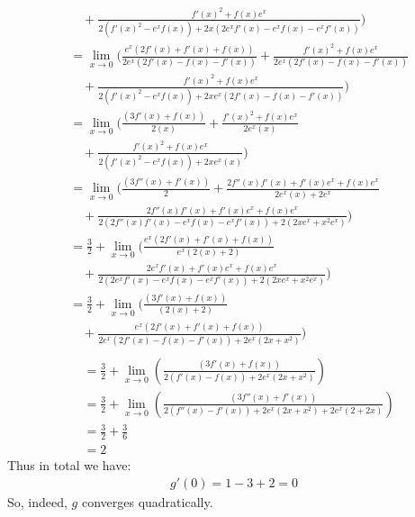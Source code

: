 \documentclass{article}
\begin{document}
\begin{enumerate}[label=\alph*.)]
\begin{align*}
&\quad +\frac{f'(x)^2 + f(x)e^x}{2(f'(x)^2 -e^xf(x)) + 2x(2e^xf'(x) - e^xf(x) - e^xf'(x))} )\\
&= \lim_{x \rightarrow 0}(\frac{e^{x}(2f'(x) + f'(x) + f(x))}{2e^x(2f'(x) - f(x) - f'(x))} + \frac{f'(x)^2 + f(x)e^x}{2e^x(2f'(x) - f(x) - f'(x))} \\
&\quad +\frac{f'(x)^2 + f(x)e^x}{2(f'(x)^2 -e^xf(x)) + 2xe^x(2f'(x) - f(x) - f'(x))} )\\
&= \lim_{x \rightarrow 0}(\frac{(3f'(x) + f(x))}{2(x)} + \frac{f'(x)^2 + f(x)e^x}{2e^x(x)} \\
&\quad +\frac{f'(x)^2 + f(x)e^x}{2(f'(x)^2 -e^xf(x)) + 2xe^x(x)} )\\
&= \lim_{x \rightarrow 0}(\frac{(3f''(x) + f'(x))}{2} + \frac{2f''(x)f'(x) + f'(x)e^x + f(x)e^x}{2e^x(x) + 2e^x} \\
&\quad +\frac{2f''(x)f'(x) + f'(x)e^x + f(x)e^x}{2(2f''(x)f'(x) -e^xf(x) - e^xf'(x)) + 2(2xe^x + x^2e^x)} )\\
&= \frac{3}{2} + \lim_{x \rightarrow 0}(\frac{e^x(2f'(x) + f'(x) + f(x))}{e^x(2(x) + 2)} \\
&\quad +\frac{2e^xf'(x) + f'(x)e^x + f(x)e^x}{2(2e^xf'(x) -e^xf(x) - e^xf'(x)) + 2(2xe^x + x^2e^x)} )\\
&= \frac{3}{2} + \lim_{x \rightarrow 0}(\frac{(3f'(x) + f(x))}{(2(x) + 2)} \\
&\quad +\frac{e^x(2f'(x) + f'(x) + f(x))}{2e^x(2f'(x) -f(x) - f'(x)) + 2e^x(2x + x^2)} )\\
\end{align*}
\begin{align*}
&= \frac{3}{2} + \lim_{x \rightarrow 0}(\frac{(3f'(x)+ f(x))}{2(f'(x) -f(x)) + 2e^x(2x + x^2)} )\\
&=  \frac{3}{2} + \lim_{x \rightarrow 0}(\frac{(3f''(x)+ f'(x))}{2(f''(x) -f'(x)) + 2e^x(2x + x^2) + 2e^x(2 + 2x)} )\\
&= \frac{3}{2} + \frac{3}{6} \\
&= 2
\end{align*}
Thus in total we have:\\
\begin{align*}
g'(0) = 1 - 3 + 2 = 0
\end{align*}
So, indeed, $g$ converges quadratically. 
\end{enumerate}
\end{document}
